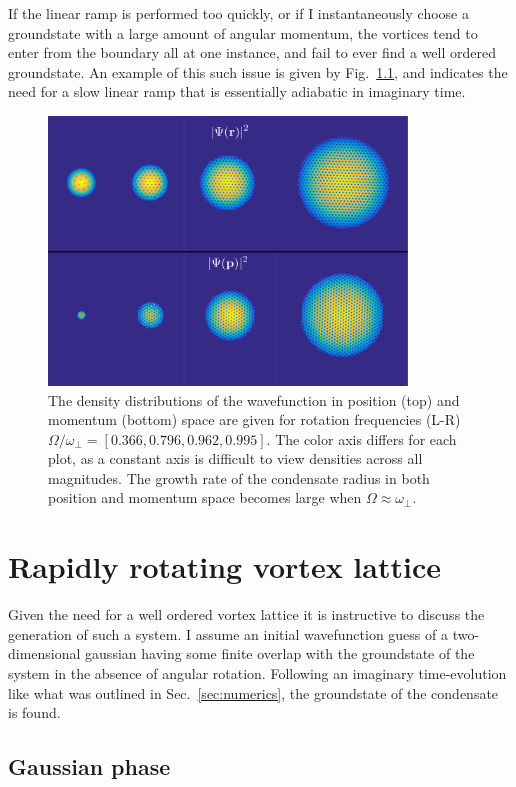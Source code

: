 If the linear ramp is performed too quickly, or if I instantaneously choose a groundstate with a large amount of angular momentum, the vortices tend to enter from the boundary all at one instance, and fail to ever find a well ordered groundstate. An example of this such issue is given by Fig.~\ref{}, and indicates the need for a slow linear ramp that is essentially adiabatic in imaginary time.
\begin{figure}
    \includegraphics[width=0.85\textwidth]{Images/ch4_vtx/ramp_omega.pdf}
    \caption{The density distributions of the wavefunction in position (top) and momentum (bottom) space are given for rotation frequencies (L-R) $\Omega/\omega_\perp=[0.366,0.796,0.962,0.995]$. The color axis differs for each plot, as a constant axis is difficult to view densities across all magnitudes. The growth rate of the condensate radius in both position and momentum space becomes large when $\Omega \approx \omega_\perp$.}
    \label{fig:malformed_lattice}
\end{figure}

\section{Rapidly rotating vortex lattice}
Given the need for a well ordered vortex lattice it is instructive to discuss the generation of such a system. I assume an initial wavefunction guess of a two-dimensional gaussian having some finite overlap with the groundstate of the system in the absence of angular rotation. Following an imaginary time-evolution like what was outlined in Sec.~\ref{sec:numerics}, the groundstate of the condensate is found.


\subsection{Gaussian phase}

